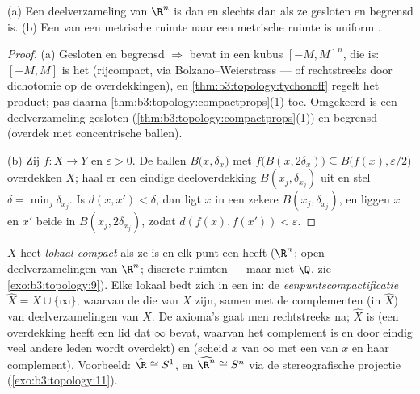 \begin{corollary}
\label{cor:b3:topology:heineborel}
(a) Een deelverzameling van $\R^n$ is  dan en slechts dan
als ze gesloten en begrensd is.
(b) Een  van een  metrische ruimte naar
een metrische ruimte is uniform .
\end{corollary}

\begin{proof}
(a) Gesloten en begrensd $\Rightarrow$ bevat in een kubus
$[-M,M]^n$, die  is: $[-M, M]$ is het (rijcompact, via
Bolzano--Weierstrass --- of rechtstreeks door dichotomie op de
overdekkingen), en \cref{thm:b3:topology:tychonoff} regelt het
product; pas daarna \cref{thm:b3:topology:compactprops}(1) toe.
Omgekeerd is een  deelverzameling gesloten
(\cref{thm:b3:topology:compactprops}(1)) en begrensd (overdek met
concentrische ballen).

(b) Zij $f \colon X \to Y$ en $\varepsilon > 0$. De ballen
$B\bigl(x, \delta_x\bigr)$ met $f\bigl(B(x,
2\delta_x)\bigr)\subseteq B\bigl(f(x), \varepsilon/2\bigr)$
overdekken $X$; haal er een eindige deeloverdekking $B(x_j,
\delta_{x_j})$ uit en stel $\delta = \min_j \delta_{x_j}$. Is
$d(x, x') < \delta$, dan ligt $x$ in een zekere $B(x_j,
\delta_{x_j})$, en liggen $x$ en $x'$ beide in $B(x_j,
2\delta_{x_j})$, zodat $d(f(x), f(x')) < \varepsilon$.
\end{proof}

\begin{definition}\label{def:b3:topology:locallycompact}
$X$ heet \emph{lokaal compact} als
ze  is en elk punt een   heeft ($\R^n$;
open deelverzamelingen van $\R^n$; discrete ruimten --- maar niet
$\Q$, zie \cref{exo:b3:topology:9}). Elke lokaal 
bedt zich in een  in: de
\emph{eenpuntscompactificatie}
$\hat X = X \cup \{\infty\}$, waarvan de  die
van $X$ zijn, samen met de complementen (in $\hat X$) van 
deelverzamelingen van $X$. De axioma's gaat men rechtstreeks na;
$\hat X$ is  (een overdekking heeft een lid dat $\infty$
bevat, waarvan het complement  is en door eindig veel
andere leden wordt overdekt) en  (scheid $x$ van $\infty$
met een   van $x$ en haar complement). Voorbeeld:
$\hat\R \cong S^1$, en $\widehat{\R^n} \cong S^n$ via de
stereografische projectie (\cref{exo:b3:topology:11}).
\end{definition}

